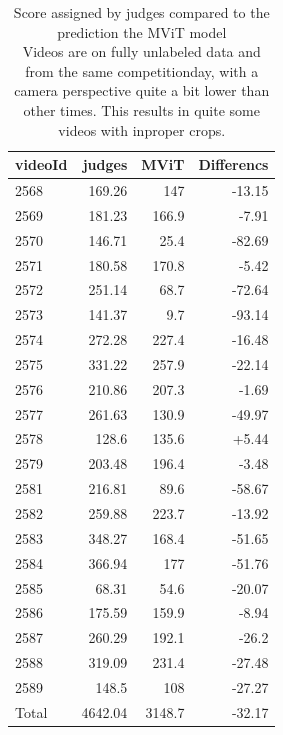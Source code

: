 \begin{table}[h!]
    \begin{tabular}{|l|r|r|r|}
        \hline
        videoId & judges    & MViT         & Differencs \\ \hline
        2568	& 169.26	&   147	       & -13.15 \\
        2569	& 181.23	&   166.9	   & -7.91  \\
        2570	& 146.71	&   25.4	   & -82.69 \\
        2571	& 180.58	&   170.8	   & -5.42  \\
        2572	& 251.14	&   68.7       & -72.64 \\
        2573	& 141.37	&   9.7	       & -93.14 \\
        2574	& 272.28	&   227.4	   & -16.48 \\
        2575	& 331.22	&   257.9	   & -22.14 \\
        2576	& 210.86	&   207.3	   & -1.69  \\
        2577	& 261.63	&   130.9	   & -49.97 \\
        2578	& 128.6	    &   135.6	   & +5.44  \\
        2579	& 203.48	&   196.4	   & -3.48  \\
        2581	& 216.81	&   89.6	   & -58.67 \\
        2582	& 259.88	&   223.7	   & -13.92 \\
        2583	& 348.27	&   168.4	   & -51.65 \\
        2584	& 366.94	&   177 	   & -51.76 \\
        2585	& 68.31	    &   54.6	   & -20.07 \\
        2586	& 175.59	&   159.9	   & -8.94  \\
        2587	& 260.29	&   192.1	   & -26.2  \\
        2588	& 319.09	&   231.4	   & -27.48 \\
        2589	& 148.5	    &   108 	   & -27.27 \\ \hline
        Total   & 4642.04	&   3148.7	   & -32.17 \\ \hline
    \end{tabular}
    \caption[judge diff score compared to MViT]{Score assigned by judges compared to the prediction the MViT model \\
    Videos are on fully unlabeled data and from the same competitionday, with a camera perspective quite a bit lower than other times.
    This results in quite some videos with inproper crops.}
    \label{tbl:judge-score-comparison}
\end{table}